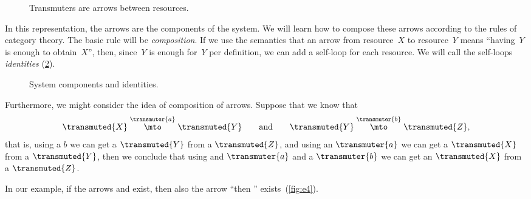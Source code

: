 
\begin{figure}[h!]
    \centering
    \caption{Transmuters are arrows between resources.}
    \label{fig:e2}
\end{figure}

In this representation, the arrows are the components of the system.
We will learn how to compose these arrows according to the rules of category theory.
The basic rule will be \emph{composition}.
If we use the semantics that an arrow from resource~$X$ to resource~$Y$ means ``having~$Y$ is
enough to obtain~$X$'', then, since~$Y$ is enough for~$Y$ per definition, we can add a self-loop for each
resource.
We will call the self-loops \emph{identities} (\cref{fig:e3}).

\begin{figure}[h!]
    \centering
    \caption{System components and identities. }
    \label{fig:e3}
\end{figure}


Furthermore, we might consider the idea of composition of arrows.
Suppose that we know that
\begin{equation*}
    \transmuted{X} \stackrel{\transmuter{a}}{\mto} \transmuted{Y}
    \qquad \text{and} \qquad
    \transmuted{Y} \stackrel{\transmuter{b}}{\mto} \transmuted{Z},
\end{equation*}
that is, using a $b$ we can get a $\transmuted{Y}$ from a $\transmuted{Z}$, and using an $\transmuter{a}$ we can get a $\transmuted{X}$ from a $\transmuted{Y}$,
then we conclude that using and $\transmuter{a}$ and a $\transmuter{b}$ we can get an $\transmuted{X}$ from a $\transmuted{Z}$.

In our example, if the arrows \wheels  and \motor exist, then also the arrow ``\wheels then \motor'' exists~(\cref{fig:e4}).

